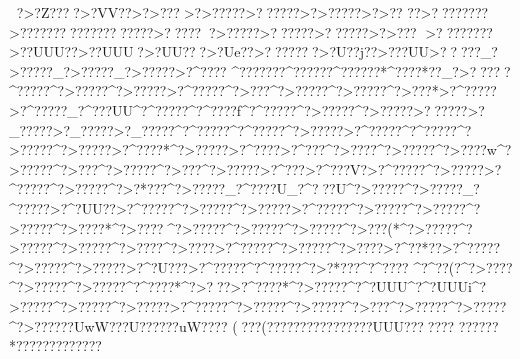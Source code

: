 {{{{{{{{{{{{{{{{{{{{{{{{{{{{{{{{{{{{{{{{{{{{{{{{{{{{{{{{{{{{{{{{{{{{{{{{{{{{{{{{{{{{{{{{{{{{{{{{{{{{{{{{{{{{{{{{{{{{{{{{{{{{{{{{{{{{{{{{{{{{{{{{{{{{{{{{{{{{{{{{{{{{{{{{{{{{{{{{{{{{{{{{{{{{{{{{{{{{{{{{{{{{{{{{{{{{{{{{{{{{{{{{{{{{{{{{{{{{{{{{{{{{{{{{{{{{{{{{{{{{{{{{{{{{{{{{{{{{{{{{{{{{{{{{{{{{{{{{{{{{{{{{{{{{{{{{{{{{{{{{{{{{{{{{{{{{{{{{{{{{{{{{{{{{{{{{{{{{{{{{{{{{{{{{{{{{{{{{{{{{{{{{{{{{{{{{{{{{{{{{{{{{{{{{{{{{{{{{{{{{{{{{{{{{{{{{{{{{{{{{{{{{{{{{{{{{{{{{{{{{{{{{{{{{{{{{{{{{{{{{{{{{{{{{{{{{{{{{{{{{{{{{{{{{{{{{{{{{{{{{{{{{{{{{{{{{{{{{{{{{{{{{{{{{{{{{{{{{{{{{{{{{{{{{{{{{{{{{{{{{{{{{{{{{{{{{{{{{{{{{{{{{{{{{{{{{{{{{{{{{{{{{{{{{{{{{{{{{{{{{{{{{{{{{{{{{{{{{{{{{{{{{{{{{{{{{{{{{{{{{{{{{{{{{{{{{{{{{{{{{{{{{{{{{{{{{{{{{{{{{{{{{{{{{{{{{{{{{{{{{{{{{{{{{{{{{{{{{{{{{{{{{{{{{{{{{{{{{{{{{{{{{{{{{{{{{{{{{{{{{{{{{{{{{{{{{{{{{{{{{{{{{{{{{{{{{{{{{{{{{{{{{{{{{{{{{{{{{{{{{{{{{{{{{{{{{{{{{{{{{{{{{{{{{{{{{{{{{{{{{{{{{{{{{{{{{{{{{{{{{{{{{{{{{{{{{{{{{{{{{{{{{{{{{{{{{{{{{{{{{{{{{{{{{{{{{{{{{{{{{{{{{{{{{{{{{{{{{{{{{{{{{{{{{{{{{{{{{{{{{{{{{{{{{{{{{{{{{{{{{{{{{{{{{{{{{{{{{{{{{{{{{{{{{{{{{{{{{{{{{{{{{{{{{{{{{{{{{{{{{{{{{{{{{{{{{{{{{{{{{{{{{{{{{{{{{{{{{{{{{{{{{{{{{{{{{{{{{{{{{{{{{{{{{{{{{{{{{{{{{{{{{{{{{{{{{{{{{{{{{{{{{{{{{{{{{{{{{{{{{{{{{{{{{{{{{{{{{{{{{{{{{{{{{{{{{{{{{{{{{{{{{{{{{{{{{{{{{{{{{{{{{{{{{{{{{{{{{{{{{{{{{{{{{{{{{{{{{{{{{{{{{{{{{{{{{{{{{{{{{{{{{{{{{{{{{{{{{{{{{{{{{{{{{{{{{{{{{{{{{{{{{{{{{{{{{{{{{{{{{{{{{{{{{{{{{{{{{{{{{{{{{{{{{{{{{{{{{{{{{{{{{{{{{{{{{{{{{{{{{{{{{{{{{{{{{{{{{{{{{{{{{{{{{{{{{{{{{{{{{{{{{{{{{{{{{{{{{{{{{{{{{{{{{{{{{{{{{{{{{{{{{{{{{{{{{{{{{{{{{{{{{{{{{{{{{{{{{{{{{{{{{{{{{{{{{{{{{{{{{{{{{{{{{{{{{{{{{{{{{{{{{{{{{{{{{{{{{{{{{{{{{{{{{{{{{{{{{{{{{{{{{{{{{{{{{{{{{{{{{{{{{{{{{{{{{{{{{{{{{{{{{{{{{{{{{{{{{{{{{{{{{{{{{{{{{{{{{{{{{{{{{{{{{{{{{{{{{{{{{{{{{{{{{{{{{{{{{{{{{{{{{{{{{{{{{{{{{{{{{{{{{{{{{{{{{{{{{{{{{{{{{{{{{{{{{{{{{{{{{{{{{{{{{{{{{{{{{{{{{?>?Z????>?VV??>?>??? >?>?????>??????>?>?????>?>??
??>????????>???????????????????>??????>?????>??????>??????>?>???
>????????>??UUU??>??UUU?>?UU???>?Ue??>???????>?U??j??>???UU>?????_?>?????_?>?????_?>?????>?^???? ^???????^??????^??????*^????*??_?>?????^?????^?>?????^?>?????>?^?????^?>???^?>?????^?>?????^?>? ??*>?^?????>?^?????_?^???UU^?^?????^?^????f^?^?????^?>?????^?>?????>??????>?_?????>?_?????>?_?????^?^?????^?^?????^?>?????>?^?????^?^?????^?>?????^?>?????>?^????*^?>?????>?^???? >?^???  ^?>????^?>?????^?>????w^?>?????^?>???^?>?????^?>???^?>?????>?^???>?^???V?>?^?????^?>?????>?^?????^?>?????^?>?*???^?>?????_?^????U_?^???U^?>?????^?>?????_?^?????>?^?UU??>?^?????^?>?????^?>?????>?^?????^?>?????^?>?????^?>?????^?>????*^?>????^?>?????^?>?????^?>?????^?>???(*^?>?????^?>?????^?>?????^?>????^?>????>?^?????^?>?????^?>????>?^??*??>?^?????^?>?????^?>?????>?^?U???>?^?????^?^?????^?>?*???^?^????
^?^??(? ^?>????^?>?????^?>?????^?^????*^?>? ??>?^????*^?>?????^?^?UUU ^?^?UUUi^?>?????^?>?????^?>?????>?^?????^?>?????^?>?????^?>???^?>?????^?>?????^?>??????UwW???U??????uW????
( ???(   ????????????????UUU????  ???
??????*?????????????  }}}}}}}}}}}}}}}}}}}}}}}}}}}}}}}}}}}}}}}}}}}}}}}}}}}}}}}}}}}}}}}}}}}}}}}}}}}}}}}}}}}}}}}}}}}}}}}}}}}}}}}}}}}}}}}}}}}}}}}}}}}}}}}}}}}}}}}}}}}}}}}}}}}}}}}}}}}}}}}}}}}}}}}}}}}}}}}}}}}}}}}}}}}}}}}}}}}}}}}}}}}}}}}}}}}}}}}}}}}}}}}}}}}}}}}}}}}}}}}}}}}}}}}}}}}}}}}}}}}}}}}}}}}}}}}}}}}}}}}}}}}}}}}}}}}}}}}}}}}}}}}}}}}}}}}}}}}}}}}}}}}}}}}}}}}}}}}}}}}}}}}}}}}}}}}}}}}}}}}}}}}}}}}}}}}}}}}}}}}}}}}}}}}}}}}}}}}}}}}}}}}}}}}}}}}}}}}}}}}}}}}}}}}}}}}}}}}}}}}}}}}}}}}}}}}}}}}}}}}}}}}}}}}}}}}}}}}}}}}}}}}}}}}}}}}}}}}}}}}}}}}}}}}}}}}}}}}}}}}}}}}}}}}}}}}}}}}}}}}}}}}}}}}}}}}}}}}}}}}}}}}}}}}}}}}}}}}}}}}}}}}}}}}}}}}}}}}}}}}}}}}}}}}}}}}}}}}}}}}}}}}}}}}}}}}}}}}}}}}}}}}}}}}}}}}}}}}}}}}}}}}}}}}}}}}}}}}}}}}}}}}}}}}}}}}}}}}}}}}}}}}}}}}}}}}}}}}}}}}}}}}}}}}}}}}}}}}}}}}}}}}}}}}}}}}}}}}}}}}}}}}}}}}}}}}}}}}}}}}}}}}}}}}}}}}}}}}}}}}}}}}}}}}}}}}}}}}}}}}}}}}}}}}}}}}}}}}}}}}}}}}}}}}}}}}}}}}}}}}}}}}}}}}}}}}}}}}}}}}}}}}}}}}}}}}}}}}}}}}}}}}}}}}}}}}}}}}}}}}}}}}}}}}}}}}}}}}}}}}}}}}}}}}}}}}}}}}}}}}}}}}}}}}}}}}}}}}}}}}}}}}}}}}}}}}}}}}}}}}}}}}}}}}}}}}}}}}}}}}}}}}}}}}}}}}}}}}}}}}}}}}}}}}}}}}}}}}}}}}}}}}}}}}}}}}}}}}}}}}}}}}}}}}}}}}}}}}}}}}}}}}}}}}}}}}}}}}}}}}}}}}}}}}}}}}}}}}}}}}}}}}}}}}}}}}}}}}}}}}}}}}}}}}}}}}}}}}}}}}}}}}}}}}}}}}}}}}}}}}}}}}}}}}}}}}}}}}}}}}}}}}}}}}}}}}}}}}}}}}}}}}}}}}}}}}}}}}}}}}}}}}}}}}}}}}}}}}}}}}}}}}}}}}}}}}}}}}}}}}}}}}}}}}}}}}}}}}}}}}}}}}}}}}}}}}}}}}}}}}}}}}}}}}}}}}}}}}}}}}}}}}}}}}}}}}}}}}}}}}}}}}}}}}}}}}}}}}}}}}}}}}}}}}}}}}}}}}}}}}}}}}}}}}}}}}}}}}}}}}}}}}}}}}}}}}}}}}}}}}}}}}}}}}}}}}}}}}}}}}}}}}}}}}}}}}}}}}}}}}}}}}}}}}}}}}}}}}}}}}}}}}}}}}}}}}}}}}}}}}}}}}}}}}}}}}}}}}}}}}}}}}}}}}}}}}}}}}}}}}}}}}}}}}}}}}}}}}}}}}}}}}}}}}}}}}}}}}}}}}}}}}}}}}}}}}}}}}}}}}}}}}}}}}}}}}}}}}}}}}}}}}}}}}}}}}}}}}}}}}}}}}}}}}}}}}}}}}}}}}}}}}}}}}}}}}}}}}}}}}}}}}}}}}}}}}}}}}}}}}}}}}}}}}}}}}}}}}}}}}}}}}}}}}}}}}}}}}}}}}}}}}}}}}}}}}}}}}}}}}}}}}}}}}}}}}}}}}}}}}}}}}}}}}}}}}}}}}}}}}}}}}}}}}}}}}}}}}}}}}}
